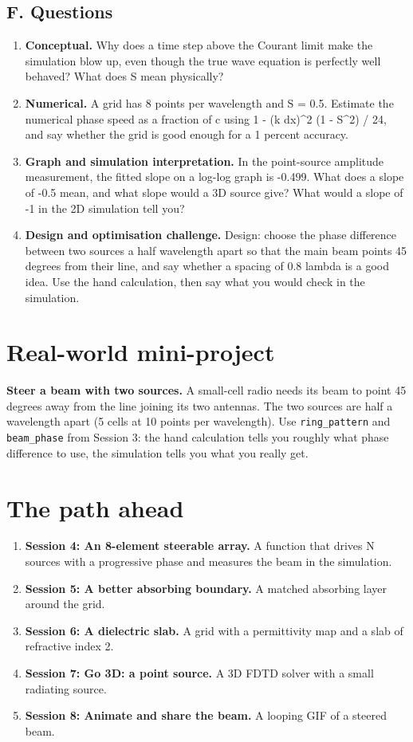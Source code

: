 \documentclass[11pt,a4paper]{article}
\begin{document}
\subsection*{F. Questions}
\begin{enumerate}[nosep]
\item \textbf{Conceptual.} Why does a time step above the Courant limit make the simulation blow up, even though the true wave equation is perfectly well behaved? What does S mean physically?
\item \textbf{Numerical.} A grid has 8 points per wavelength and S = 0.5. Estimate the numerical phase speed as a fraction of c using 1 - (k dx)\textasciicircum{}2 (1 - S\textasciicircum{}2) / 24, and say whether the grid is good enough for a 1 percent accuracy.
\item \textbf{Graph and simulation interpretation.} In the point-source amplitude measurement, the fitted slope on a log-log graph is -0.499. What does a slope of -0.5 mean, and what slope would a 3D source give? What would a slope of -1 in the 2D simulation tell you?
\item \textbf{Design and optimisation challenge.} Design: choose the phase difference between two sources a half wavelength apart so that the main beam points 45 degrees from their line, and say whether a spacing of 0.8 lambda is a good idea. Use the hand calculation, then say what you would check in the simulation.
\end{enumerate}

\section{Real-world mini-project}
\textbf{Steer a beam with two sources.} A small-cell radio needs its beam to point 45 degrees away from the line joining its two antennas. The two sources are half a wavelength apart (5 cells at 10 points per wavelength). Use \texttt{ring\_pattern} and \texttt{beam\_phase} from Session 3: the hand calculation tells you roughly what phase difference to use, the simulation tells you what you really get.

\section{The path ahead}
\begin{enumerate}[nosep]
\item \textbf{Session 4: An 8-element steerable array.} A function that drives N sources with a progressive phase and measures the beam in the simulation.
\item \textbf{Session 5: A better absorbing boundary.} A matched absorbing layer around the grid.
\item \textbf{Session 6: A dielectric slab.} A grid with a permittivity map and a slab of refractive index 2.
\item \textbf{Session 7: Go 3D: a point source.} A 3D FDTD solver with a small radiating source.
\item \textbf{Session 8: Animate and share the beam.} A looping GIF of a steered beam.
\end{enumerate}
\end{document}
